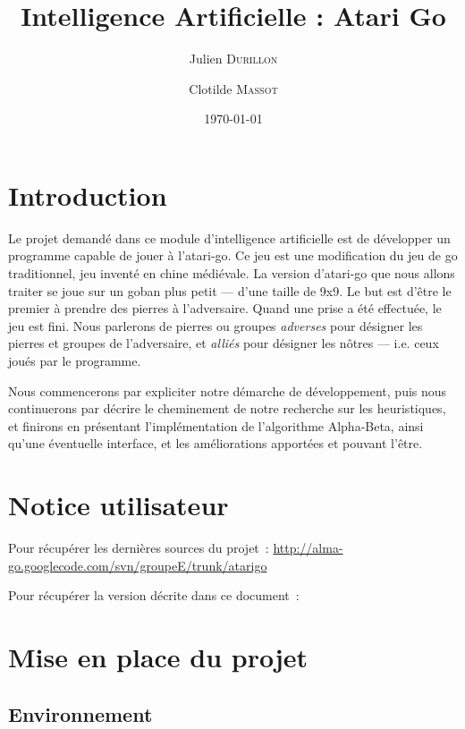 \documentclass[11pt,a4paper,titlepage,french]{article}
\title{Intelligence Artificielle : Atari Go}
\author{Julien \textsc{Durillon} \and Clotilde \textsc{Massot}}
\date{\today}
\begin{document}
	

	\tableofcontents
	\clearpage

	\listoffigures
	\clearpage


	\section*{Introduction}
		Le projet demandé dans ce module d'intelligence artificielle est de développer un programme capable de jouer à l'atari-go. Ce jeu est une modification du jeu de go traditionnel, jeu inventé en chine médiévale. La version d'atari-go que nous allons traiter se joue sur un goban plus petit --- d'une taille de 9x9. Le but est d'être le premier à prendre des pierres à l'adversaire. Quand une prise a été effectuée, le jeu est fini. Nous parlerons de pierres ou groupes \emph{adverses} pour désigner les pierres et groupes de l'adversaire, et \emph{alliés} pour désigner les nôtres --- i.e. ceux joués par le programme.

		Nous commencerons par expliciter notre démarche de développement, puis nous continuerons par décrire le cheminement de notre recherche sur les heuristiques, et finirons en présentant l'implémentation de l'algorithme Alpha-Beta, ainsi qu'une éventuelle interface, et les améliorations apportées et pouvant l'être.

	\section*{Notice utilisateur}

		Pour récupérer les dernières sources du projet~: \url{http://alma-go.googlecode.com/svn/groupeE/trunk/atarigo}

		Pour récupérer la version décrite dans ce document~: %

	\section{Mise en place du projet}
		\subsection{Environnement}
\end{document}
